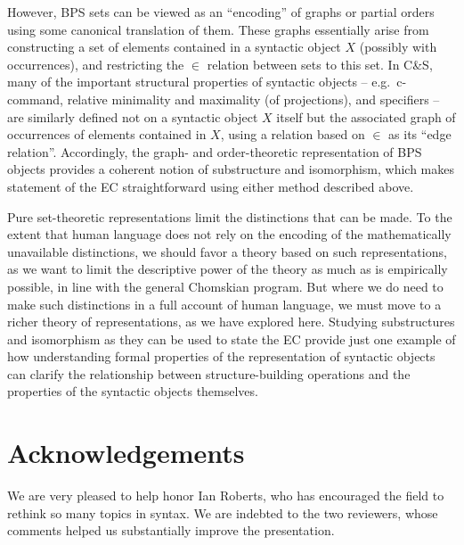 \documentclass[output=paper]{langsci/langscibook}
\begin{document}
However, \gls{BPS} sets can be viewed as an \enquote{encoding} of graphs or partial
orders using some canonical translation of them. These graphs essentially arise
from constructing a set of elements contained in a syntactic object $X$
(possibly with occurrences), and restricting the $\in$ relation between sets to
this set.  In C\&S, many of the important structural
properties of syntactic objects -- e.g.\ c-command, relative minimality and
maximality (of projections), and specifiers -- are similarly defined not on a
syntactic object $X$ itself but the associated graph of occurrences of elements
contained in $X$, using a relation based on $\in$ as its ``edge relation''.
Accordingly, the graph- and order-theoretic representation of \gls{BPS} objects provides a coherent notion of substructure and
isomorphism, which makes statement of the \gls{EC}
straightforward using either method described above.

Pure set-theoretic representations limit the distinctions that can be made. To
the extent that human language does not rely on the encoding of the
mathematically unavailable distinctions, we should favor a theory based on such
representations, as we want to limit the descriptive power of the theory as
much as is empirically possible, in line with the general Chomskian program.
But where we do need to make such distinctions in a full account of human
language, we must move to a richer theory of representations, as we have
explored here. Studying substructures and isomorphism as they can be used to
state the \gls{EC} provide just one example of how understanding formal properties of
the representation of syntactic objects can clarify the relationship between
structure-building operations and the properties of the syntactic objects
themselves.

\printchapterglossary{}

\section*{Acknowledgements}

We are very pleased to help honor Ian Roberts, who has encouraged the field to
rethink so many topics in syntax. We are indebted to the two reviewers, whose
comments helped us substantially improve the presentation.

{\sloppy\printbibliography[heading=subbibliography,notkeyword=this]}
\end{document}
